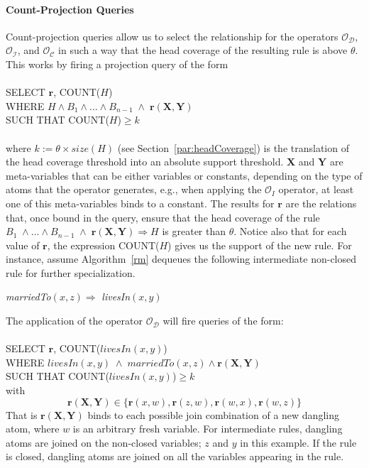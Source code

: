 \paragraph{Count-Projection Queries} Count-projection queries allow us to select the relationship for the operators 
$\mathcal{O_D}$, $\mathcal{O_I}$, and $\mathcal{O_C}$ in such a way
that the head coverage of the resulting rule is above $\theta$.
This works by firing a projection query of the form
\\ \\
SELECT $\bm{r}$, COUNT($H$)\\
WHERE $H \wedge B_1 \wedge ... \wedge B_{n-1}\; \wedge\; \bm{r}(\bm{X},\bm{Y})$\\
SUCH THAT COUNT($H$)$\geq k$
\\ \\
where $k := \theta \times size(H)$ (see Section~\ref{par:headCoverage}) is the translation of the
head coverage threshold into an absolute support threshold. $\bm{X}$ and $\bm{Y}$ are meta-variables that
can be either variables or constants, 
depending on the type of atoms that the operator generates, e.g., when applying the $\mathcal{O}_I$ operator, 
at least one of this meta-variables binds to a constant.
The results for $\bm{r}$ are the relations that, once bound in the query, ensure that the head coverage 
of the rule $B_1 \; \wedge ... \wedge B_{n-1} \;\wedge\; \bm{r}(\bm{X},\bm{Y}) \Rightarrow H$ is greater than $\theta$.
Notice also that for each value of $\bm{r}$, the expression COUNT($H$) gives us the support of the new rule.
For instance, assume Algorithm~\ref{rm} dequeues the following intermediate non-closed rule for further specialization.

\begin{center}
\emph{marriedTo}$(x,z) \Rightarrow $ \emph{livesIn}$(x,y)$
\end{center}

\noindent
The application of the operator $\mathcal{O_D}$ will fire queries of the form:\\ \\
SELECT $\bm{r}$, COUNT($livesIn(x,y)$) \\
WHERE $livesIn(x,y) \; \wedge \; marriedTo(x,z) \wedge \bm{r}(\bm{X}, \bm{Y})$\\
SUCH THAT COUNT($livesIn(x,y)$)$\ge k$\\

\noindent with 
\[
\bm{r}(\bm{X}, \bm{Y}) \in \{\bm{r}(x,w), \bm{r}(z,w), \bm{r}(w,x), \bm{r}(w,z) \}
\]
That is $\bm{r}(\bm{X}, \bm{Y})$ binds to each possible join combination of a new dangling atom,
where $w$ is an arbitrary fresh variable. For intermediate rules, dangling atoms are joined on the non-closed variables; 
$z$ and $y$ in this example.
If the rule is closed, dangling atoms are joined on all the variables appearing in the rule.

